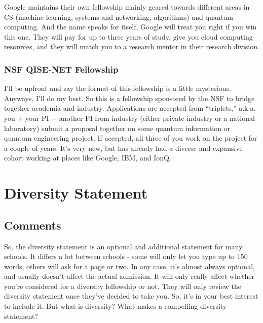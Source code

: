 \documentclass[12pt]{article}
\begin{document}
Google maintains their own fellowship mainly geared towards different areas in CS (machine learning, systems and networking, algorithms) and quantum computing. And the name speaks for itself, Google will treat you right if you win this one. They will pay for up to three years of study, give you cloud computing resources, and they will match you to a research mentor in their research division.

\subsubsection{NSF QISE-NET Fellowship}

I'll be upfront and say the format of this fellowship is a little mysterious. Anyways, I'll do my best. So this is a fellowship sponsored by the NSF to bridge together academia and industry. Applications are accepted from ``triplets,'' a.k.a. you + your PI + another PI from industry (either private industry or a national laboratory) submit a proposal together on some quantum information or quantum engineering project. If accepted, all three of you work on the project for a couple of years. It's very new, but has already had a diverse and expansive cohort working at places like Google, IBM, and IonQ.

\section{Diversity Statement}
\subsection{Comments}
So, the diversity statement is an optional and additional statement for many schools. It differs a lot between schools - some will only let you type up to 150 words, others will ask for a page or two. In any case, it’s almost always optional, and usually doesn’t affect the actual admission. It will only really affect whether you’re considered for a diversity fellowship or not. They will only review the diversity statement once they’ve decided to take you. So, it’s in your best interest to include it. But what is diversity? What makes a compelling diversity statement?
\end{document}
